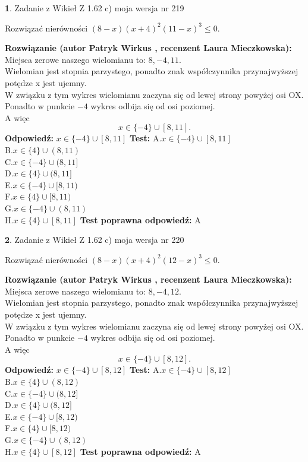 \documentclass[12pt, a4paper]{article}
\theoremstyle{definition} %
\newtheorem{zad}{}
\newcommand{\zadStart}[1]{\begin{zad}#1\newline}
\newcommand{\zadStop}{\end{zad}}
\newcommand{\rozwStart}[2]{\noindent \textbf{Rozwiązanie (autor #1 , recenzent #2): }\newline}
\newcommand{\rozwStop}{\newline}
\newcommand{\odpStart}{\noindent \textbf{Odpowiedź:}\newline}
\newcommand{\odpStop}{\newline}
\newcommand{\testStart}{\noindent \textbf{Test:}\newline}
\newcommand{\testStop}{\newline}
\newcommand{\kluczStart}{\noindent \textbf{Test poprawna odpowiedź:}\newline}
\newcommand{\kluczStop}{\newline}
\begin{document}
\zadStart{Zadanie z Wikieł Z 1.62 c) moja wersja nr 219}

Rozwiązać nierówności $(8-x)(x+4)^{2}(11-x)^{3}\le0$.
\zadStop
\rozwStart{Patryk Wirkus}{Laura Mieczkowska}
Miejsca zerowe naszego wielomianu to: $8, -4, 11$.\\
Wielomian jest stopnia parzystego, ponadto znak współczynnika przy\linebreak najwyższej potędze x jest ujemny.\\ W związku z tym wykres wielomianu zaczyna się od lewej strony powyżej osi OX.\\
Ponadto w punkcie $-4$ wykres odbija się od osi poziomej.\\
A więc $$x \in \{-4\} \cup [8,11].$$
\rozwStop
\odpStart
$x \in \{-4\} \cup [8,11]$
\odpStop
\testStart
A.$x \in \{-4\} \cup [8,11]$\\
B.$x \in \{4\} \cup (8,11)$\\
C.$x \in \{-4\} \cup (8,11]$\\
D.$x \in \{4\} \cup (8,11]$\\
E.$x \in \{-4\} \cup [8,11)$\\
F.$x \in \{4\} \cup [8,11)$\\
G.$x \in \{-4\} \cup (8,11)$\\
H.$x \in \{4\} \cup [8,11]$
\testStop
\kluczStart
A
\kluczStop



\zadStart{Zadanie z Wikieł Z 1.62 c) moja wersja nr 220}

Rozwiązać nierówności $(8-x)(x+4)^{2}(12-x)^{3}\le0$.
\zadStop
\rozwStart{Patryk Wirkus}{Laura Mieczkowska}
Miejsca zerowe naszego wielomianu to: $8, -4, 12$.\\
Wielomian jest stopnia parzystego, ponadto znak współczynnika przy\linebreak najwyższej potędze x jest ujemny.\\ W związku z tym wykres wielomianu zaczyna się od lewej strony powyżej osi OX.\\
Ponadto w punkcie $-4$ wykres odbija się od osi poziomej.\\
A więc $$x \in \{-4\} \cup [8,12].$$
\rozwStop
\odpStart
$x \in \{-4\} \cup [8,12]$
\odpStop
\testStart
A.$x \in \{-4\} \cup [8,12]$\\
B.$x \in \{4\} \cup (8,12)$\\
C.$x \in \{-4\} \cup (8,12]$\\
D.$x \in \{4\} \cup (8,12]$\\
E.$x \in \{-4\} \cup [8,12)$\\
F.$x \in \{4\} \cup [8,12)$\\
G.$x \in \{-4\} \cup (8,12)$\\
H.$x \in \{4\} \cup [8,12]$
\testStop
\kluczStart
A
\kluczStop
\end{document}
